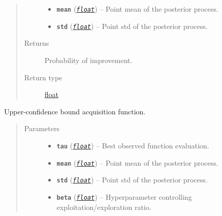 \documentclass[letterpaper,10pt,english]{sphinxmanual}
\begin{document}
\begin{fulllineitems}
\begin{fulllineitems}
\begin{quote}
\begin{description}
\begin{itemize}
\item {} 
\textbf{\texttt{mean}} (\href{https://docs.python.org/2/library/functions.html\#float}{\emph{\texttt{float}}}) -- Point mean of the posterior process.

\item {} 
\textbf{\texttt{std}} (\href{https://docs.python.org/2/library/functions.html\#float}{\emph{\texttt{float}}}) -- Point std of the posterior process.

\end{itemize}

\item[{Returns}] \leavevmode
Probability of improvement.

\item[{Return type}] \leavevmode
\href{https://docs.python.org/2/library/functions.html\#float}{float}

\end{description}\end{quote}

\end{fulllineitems}


\begin{fulllineitems}
\label{pyGPGO.acquisition:pyGPGO.acquisition.Acquisition.UCB}
Upper-confidence bound acquisition function.
\begin{quote}\begin{description}
\item[{Parameters}] \leavevmode\begin{itemize}
\item {} 
\textbf{\texttt{tau}} (\href{https://docs.python.org/2/library/functions.html\#float}{\emph{\texttt{float}}}) -- Best observed function evaluation.

\item {} 
\textbf{\texttt{mean}} (\href{https://docs.python.org/2/library/functions.html\#float}{\emph{\texttt{float}}}) -- Point mean of the posterior process.

\item {} 
\textbf{\texttt{std}} (\href{https://docs.python.org/2/library/functions.html\#float}{\emph{\texttt{float}}}) -- Point std of the posterior process.

\item {} 
\textbf{\texttt{beta}} (\href{https://docs.python.org/2/library/functions.html\#float}{\emph{\texttt{float}}}) -- Hyperparameter controlling exploitation/exploration ratio.


\end{itemize}
\end{description}
\end{quote}
\end{fulllineitems}
\end{fulllineitems}
\end{document}
